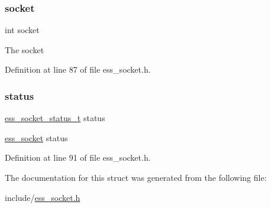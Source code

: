 \subsubsection{\texorpdfstring{socket}{socket}}
{\footnotesize\ttfamily int socket}

The socket 

Definition at line 87 of file ess\+\_\+socket.\+h.

\mbox{\label{structess__socket_a4e47521e8af756b9edf77f1f02f9b725}} 
\subsubsection{\texorpdfstring{status}{status}}
{\footnotesize\ttfamily \hyperlink{ess__socket_8h_ae3a6dc482fc34f9ea0361820ba4be573}{ess\+\_\+socket\+\_\+status\+\_\+t} status}

\hyperlink{structess__socket}{ess\+\_\+socket} status 

Definition at line 91 of file ess\+\_\+socket.\+h.



The documentation for this struct was generated from the following file\+:\begin{DoxyCompactItemize}
\item 
include/\hyperlink{ess__socket_8h}{ess\+\_\+socket.\+h}\end{DoxyCompactItemize}
